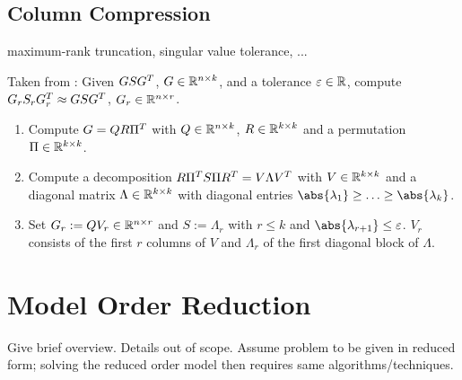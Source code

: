 \subsection{Column Compression}
\label{sec:lr:compression}

maximum-rank truncation,
singular value tolerance,
...

Taken from \cite[Section 6.3.3]{Lang2017}:
Given $GSG^T$, $G\in\mathbb{R}^{n\times k}$, and a tolerance $\varepsilon\in\mathbb{R}$,
compute $G_rS_rG_r^T \approx GSG^T$, $G_r\in\mathbb{R}^{n\times r}$.
\begin{enumerate}
  \item
    Compute $G=QR\Pi^T$ with $Q\in\mathbb{R}^{n\times k}$, $R\in\mathbb{R}^{k\times k}$ and a permutation $\Pi\in\mathbb{R}^{k\times k}$.
  \item
    Compute a decomposition $R \Pi^T S \Pi R^T = V \Lambda V^T$ with $V \in \mathbb{R}^{k\times k}$
    and a diagonal matrix $\Lambda\in\mathbb{R}^{k\times k}$ with diagonal entries $\abs{\lambda_1}\geq\ldots\geq\abs{\lambda_k}$.
  \item
    Set $G_r := QV_r \in\mathbb{R}^{n\times r}$ and $S := \Lambda_r$ with $r\leq k$ and $\abs{\lambda_{r+1}}\leq\epsilon$.
    $V_r$ consists of the first $r$ columns of $V$ and $\Lambda_r$ of the first diagonal block of $\Lambda$.
\end{enumerate}


\section{Model Order Reduction}
Give brief overview.
Details out of scope.
Assume problem to be given in reduced form;
solving the reduced order model then requires same algorithms/techniques.
